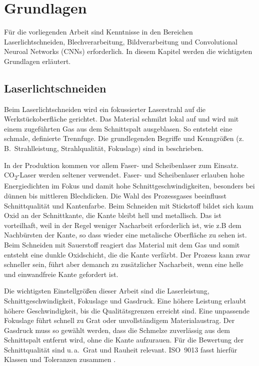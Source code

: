 \chapter{Grundlagen}

Für die vorliegenden Arbeit sind Kenntnisse in den Bereichen Laserlichtschneiden, Blechverarbeitung, Bildverarbeitung und Convolutional Neuroal Networks (CNNs) erforderlich. In diesem Kapitel werden die wichtigsten Grundlagen erläutert.

\section{Laserlichtschneiden}
\label{sec:laserlichtschneiden}

Beim Laserlichtschneiden wird ein fokussierter Laserstrahl auf die Werkstückoberfläche gerichtet. Das Material schmilzt lokal auf und wird mit einem zugeführten Gas aus dem Schnittspalt ausgeblasen. So entsteht eine schmale, definierte Trennfuge. Die grundlegenden Begriffe und Kenngrößen (z.\,B.\ Strahlleistung, Strahlqualität, Fokuslage) sind in \parencite{ISO11145-2018} beschrieben.

In der Produktion kommen vor allem Faser- und Scheibenlaser zum Einsatz. CO\textsubscript{2}-Laser werden seltener verwendet. Faser- und Scheibenlaser erlauben hohe Energiedichten im Fokus und damit hohe Schnittgeschwindigkeiten, besonders bei dünnen bis mittleren Blechdicken. Die Wahl des Prozessgases beeinflusst Schnittqualität und Kantenfarbe. Beim Schneiden mit Stickstoff bildet sich kaum Oxid an der Schnittkante, die Kante bleibt hell und metallisch. Das ist vorteilhaft, weil in der Regel weniger Nacharbeit erforderlich ist, wie z.B dem Nachbürsten der Kante, so dass wieder eine metalische Oberfläche zu sehen ist. Beim Schneiden mit Sauerstoff reagiert das Material mit dem Gas und somit entsteht eine dunkle Oxidschicht, die die Kante verfärbt. Der Prozess kann zwar schneller sein, führt aber demanch zu zusätzlicher Nacharbeit, wenn eine helle und einwandfreie Kante gefordert ist.

Die wichtigsten Einstellgrößen dieser Arbeit sind die Laserleistung, Schnittgeschwindigkeit, Fokuslage und Gasdruck. Eine höhere Leistung erlaubt höhere Geschwindigkeit, bis die Qualitätsgrenzen erreicht sind. Eine unpassende Fokuslage führt schnell zu Grat oder unvollständigem Materialaustrag. Der Gasdruck muss so gewählt werden, dass die Schmelze zuverlässig aus dem Schnittspalt entfernt wird, ohne die Kante aufzurauen. Für die Bewertung der Schnittqualität sind u.\,a.\ Grat und Rauheit relevant. ISO~9013 fasst hierfür Klassen und Toleranzen zusammen \parencite{ISO9013-2017}.

